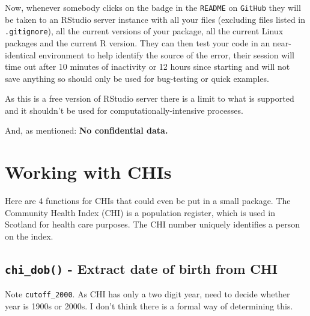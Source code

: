 \documentclass[
]{book}
\begin{document}
Now, whenever somebody clicks on the badge in the \texttt{README} on \texttt{GitHub} they will be taken to an RStudio server instance with all your files (excluding files listed in \texttt{.gitignore}), all the current versions of your package, all the current Linux packages and the current R version. They can then test your code in an near-identical environment to help identify the source of the error, their session will time out after 10 minutes of inactivity or 12 hours since starting and will not save anything so should only be used for bug-testing or quick examples.

As this is a free version of RStudio server there is a limit to what is supported and it shouldn't be used for computationally-intensive processes.

And, as mentioned: \textbf{No confidential data.}

\hypertarget{working-with-chis}{%
\section{Working with CHIs}\label{working-with-chis}}

Here are 4 functions for CHIs that could even be put in a small package.
The Community Health Index (CHI) is a population register, which is used in Scotland for health care purposes.
The CHI number uniquely identifies a person on the index.

\hypertarget{chi_dob---extract-date-of-birth-from-chi}{%
\subsection{\texorpdfstring{\texttt{chi\_dob()} - Extract date of birth from CHI}{chi\_dob() - Extract date of birth from CHI}}\label{chi_dob---extract-date-of-birth-from-chi}}

Note \texttt{cutoff\_2000}.
As CHI has only a two digit year, need to decide whether year is 1900s or 2000s.
I don't think there is a formal way of determining this.
\end{document}

